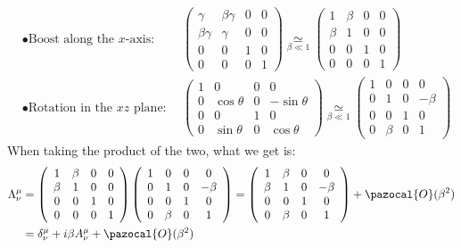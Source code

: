 \documentclass[../main.tex]{subfiles}
\begin{document}
\[
\begin{aligned}
&\bullet\text{Boost along the $x$-axis:}&&\left(\begin{array}{cccc}
\gamma & \beta\gamma & 0 & 0 \\
    \beta\gamma & \gamma & 0 & 0 \\
    0 & 0 & 1 & 0 \\
    0 & 0 & 0 & 1 
    \end{array}\right)\underset{\beta\ll1}{\simeq}\left(\begin{array}{cccc}
    1 & \beta & 0 & 0 \\
    \beta & 1 & 0 & 0 \\
    0 & 0 & 1 & 0 \\
    0 & 0 & 0 & 1 
    \end{array}\right)\\
&\bullet\text{Rotation in the $xz$ plane:}&&\left(\begin{array}{cccc}
    1 & 0 & 0 & 0 \\
    0 & \cos\theta & 0 & -\sin\theta \\
    0 & 0 & 1 & 0 \\
    0 & \sin\theta & 0 & \cos\theta 
    \end{array}\right)\underset{\beta\ll1}{\simeq}\left(\begin{array}{cccc}
    1 & 0 & 0 & 0 \\
    0 & 1 & 0 & -\beta \\
    0 & 0 & 1 & 0 \\
    0 & \beta & 0 & 1
    \end{array}\right)
\end{aligned}
\]
When taking the product of the two, what we get is:
\begin{align*}
\Lambda^\mu_\nu&=\left(\begin{array}{cccc}
    1 & \beta & 0 & 0 \\
    \beta & 1 & 0 & 0 \\
    0 & 0 & 1 & 0 \\
    0 & 0 & 0 & 1 
    \end{array}\right)\left(\begin{array}{cccc}
    1 & 0 & 0 & 0 \\
    0 & 1 & 0 & -\beta \\
    0 & 0 & 1 & 0 \\
    0 & \beta & 0 & 1
    \end{array}\right)=\left(\begin{array}{cccc}
    1 & \beta & 0 & 0 \\
    \beta & 1 & 0 & -\beta \\
    0 & 0 & 1 & 0 \\
    0 & \beta & 0 & 1
    \end{array}\right)+\pazocal{O}(\beta^2)\\
    &=\delta^\mu_\nu+i\beta A^\mu_\nu+\pazocal{O}(\beta^2)
\end{align*}
\end{document}
